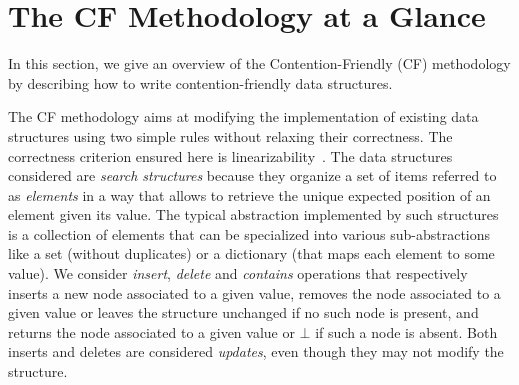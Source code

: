 
\section{The CF Methodology at a Glance}\label{sec:cf}

In this section, we give an overview of the Contention-Friendly (CF) methodology by describing how to write contention-friendly data structures.

The CF methodology aims at modifying the implementation of existing data structures using two simple rules without relaxing their correctness. The correctness criterion ensured here is linearizability~\cite{HW90}.  The data structures considered are \emph{search 
structures} because they organize a set of items referred to as \emph{elements} in a way that allows to retrieve the unique expected position of an element given its value. 
The typical abstraction implemented by such structures is a collection of elements that can be specialized into various sub-abstractions like a set (without duplicates) or a dictionary (that maps each element to some value). We consider \emph{insert}, \emph{delete} and \emph{contains} operations 
that respectively inserts a new node associated to a given value, removes the node associated to a given value or leaves the structure unchanged if no such node is present, and returns the node associated to a given value or $\bot$ if such a node is absent. Both inserts and deletes are considered \emph{updates}, even though they may not modify the structure.

